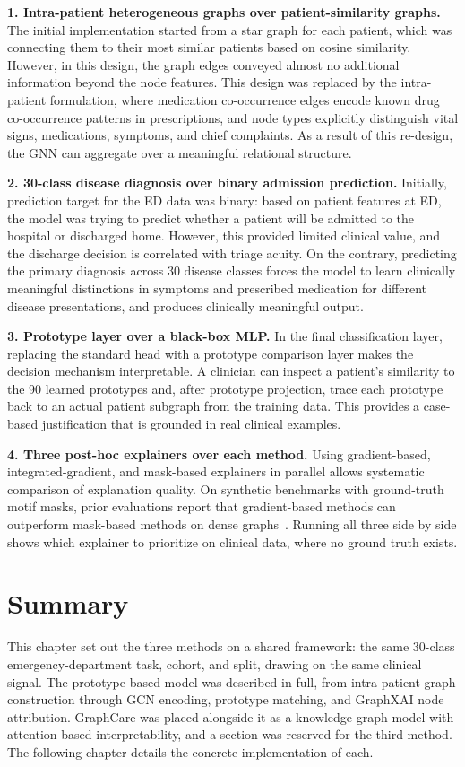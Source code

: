 \textbf{1. Intra-patient heterogeneous graphs over patient-similarity
graphs.}
The initial implementation started from a star graph for each patient, which was connecting them to their  most similar patients based on cosine similarity. However, in this design, the graph edges conveyed almost no additional information beyond
the node features. This design was replaced by the intra-patient formulation, where medication co-occurrence edges encode known drug co-occurrence patterns in prescriptions, and node types explicitly distinguish vital signs, medications, symptoms, and chief complaints. As a result of this re-design, the GNN can aggregate over a meaningful relational structure.

\textbf{2. 30-class disease diagnosis over binary admission prediction.}
Initially, prediction target for the ED data was binary: based on patient features at ED, the model was trying to predict whether a patient will be admitted to the hospital or discharged home. However, this provided limited clinical value, and the discharge decision is correlated with triage acuity. On the contrary, predicting the primary diagnosis across 30 disease classes forces the model
to learn clinically meaningful distinctions in symptoms and prescribed medication for different disease presentations, and produces clinically meaningful output.

\textbf{3. Prototype layer over a black-box MLP.}
In the final classification layer, replacing the standard head with a prototype comparison layer makes the decision mechanism interpretable. A
clinician can inspect a patient's similarity to the 90 learned prototypes and, after prototype projection, trace each prototype back to an actual patient subgraph from the training data. This provides a case-based justification that is grounded in real clinical examples.

\textbf{4. Three post-hoc explainers over each method.}
Using gradient-based, integrated-gradient, and mask-based explainers in parallel allows systematic comparison of explanation
quality. On synthetic benchmarks with ground-truth motif masks, prior evaluations report that gradient-based methods can outperform mask-based methods on dense graphs~\cite{agarwal2023graphxai}. Running all three side by side shows which explainer to prioritize on clinical data, where no ground truth exists.

\section{Summary}

This chapter set out the three methods on a shared framework: the same 30-class emergency-department task, cohort, and split, drawing on the same clinical signal. The prototype-based model was described in full, from intra-patient graph construction through GCN encoding, prototype matching, and GraphXAI node attribution. GraphCare was placed alongside it as a knowledge-graph model with attention-based interpretability, and a section was reserved for the third method. The following chapter details the concrete implementation of each.

